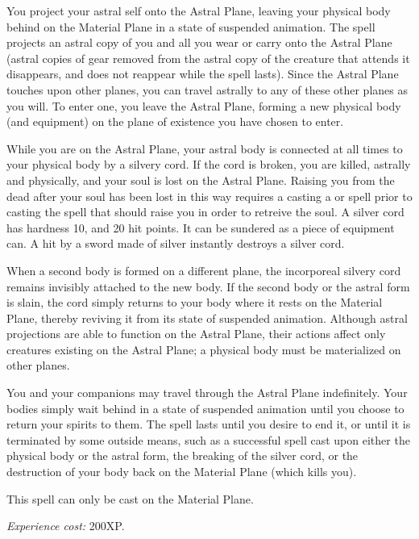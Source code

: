 You project your astral self onto the Astral Plane, 
leaving your physical body behind on the Material Plane in a state of suspended animation. 
The spell projects an astral copy of you and all you wear or carry onto the Astral Plane
(astral copies of gear removed from the astral copy of the creature that attends it disappears, and does not reappear while the spell lasts). 
Since the Astral Plane touches upon other planes, you can travel astrally to any of these other planes as you will. 
To enter one, you leave the Astral Plane, forming a new physical body (and equipment) on the plane of existence you have chosen to enter.

While you are on the Astral Plane, your astral body is connected at all times to your physical body by a silvery cord. 
If the cord is broken, you are killed, astrally and physically, and your soul is lost on the Astral Plane. 
Raising you from the dead after your soul has been lost in this way requires a casting a  or  
spell prior to casting the spell that should raise you in order to retreive the soul.
A silver cord has hardness 10, and 20 hit points. 
It can be sundered as a piece of equipment can.
A hit by a sword made of silver instantly destroys a silver cord.

When a second body is formed on a different plane, the incorporeal silvery cord remains invisibly attached to the new body. 
If the second body or the astral form is slain, 
the cord simply returns to your body where it rests on the Material Plane, thereby reviving it from its state of suspended animation. 
Although astral projections are able to function on the Astral Plane, 
their actions affect only creatures existing on the Astral Plane; a physical body must be materialized on other planes.

You and your companions may travel through the Astral Plane indefinitely. 
Your bodies simply wait behind in a state of suspended animation until you choose to return your spirits to them. 
The spell lasts until you desire to end it, or until it is terminated by some outside means, 
such as a successful  spell cast upon either the physical body or the astral form, 
the breaking of the silver cord, or the destruction of your body back on the Material Plane (which kills you).

This spell can only be cast on the Material Plane.

\emph{Experience cost:} 200XP.

